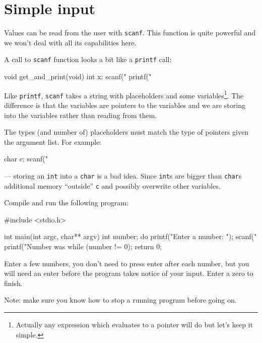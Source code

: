 
\chapter{Simple input}


Values can be read from the user with \texttt{scanf}.
This function is quite powerful and we won't deal with all its capabilities here.

A  call to \texttt{scanf} function looks a bit like a \texttt{printf} call:
\begin{codeblock}
void get_and_print(void) {
    int x;
    scanf("%
    printf("%
}
\end{codeblock}
Like \texttt{printf}, \texttt{scanf} takes a string with placeholders and some variables\footnote{Actually any expression which evaluates to a pointer will do but let's keep it simple.}.
The difference is that the variables are pointers to the variables and we are storing into the variables
rather than reading from them.

The types (and number of) placeholders must match the type of pointers given the argument list.
For example:
\begin{codeblock}
char c;
scanf("%
\end{codeblock}
--- storing an \texttt{int} into a \texttt{char} is a bad idea.
Since \texttt{int}s are bigger than \texttt{char}s additional memory ``outside'' \texttt{c} and possibly overwrite 
other variables.

Compile and run the following program:
\begin{codeblock}
#include <stdio.h>

int main(int argc, char** argv) {
    int number;
    do {
        printf("Enter a number: "); 
        scanf("%
        printf("Number was %
    } while (number != 0);
    return 0;
}
\end{codeblock}
Enter a few numbers, you don't need to press enter after each number, but you will need an enter before the program 
takes notice of your input.
Enter a zero to finish.

Note: make sure you know how to stop a running program before going on.

